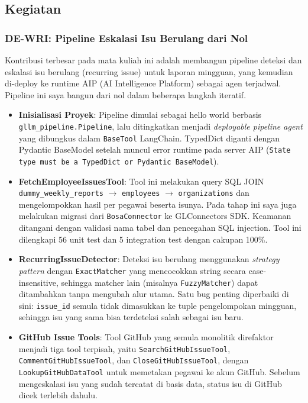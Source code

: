\subsection{Kegiatan}

\subsubsection{DE-WRI: Pipeline Eskalasi Isu Berulang dari Nol}

Kontribusi terbesar pada mata kuliah ini adalah membangun pipeline deteksi dan eskalasi isu berulang (recurring issue) untuk laporan mingguan, yang kemudian di-deploy ke runtime AIP (AI Intelligence Platform) sebagai agen terjadwal. Pipeline ini saya bangun dari nol dalam beberapa langkah iteratif.

\begin{itemize}
    \item \textbf{Inisialisasi Proyek}: Pipeline dimulai sebagai hello world berbasis \texttt{gllm\_pipeline.Pipeline}, lalu ditingkatkan menjadi \textit{deployable pipeline agent} yang dibungkus dalam \texttt{BaseTool} LangChain. TypedDict diganti dengan Pydantic BaseModel setelah muncul error runtime pada server AIP (\texttt{State type must be a TypedDict or Pydantic BaseModel}).
    \item \textbf{FetchEmployeeIssuesTool}: Tool ini melakukan query SQL JOIN \texttt{dummy\_weekly\_reports} $\rightarrow$ \texttt{employees} $\rightarrow$ \texttt{organizations} dan mengelompokkan hasil per pegawai beserta isunya. Pada tahap ini saya juga melakukan migrasi dari \texttt{BosaConnector} ke GLConnectors SDK. Keamanan ditangani dengan validasi nama tabel dan pencegahan SQL injection. Tool ini dilengkapi 56 unit test dan 5 integration test dengan cakupan 100\%.
    \item \textbf{RecurringIssueDetector}: Deteksi isu berulang menggunakan \textit{strategy pattern} dengan \texttt{ExactMatcher} yang mencocokkan string secara case-insensitive, sehingga matcher lain (misalnya \texttt{FuzzyMatcher}) dapat ditambahkan tanpa mengubah alur utama. Satu bug penting diperbaiki di sini: \texttt{issue\_id} semula tidak dimasukkan ke tuple pengelompokan mingguan, sehingga isu yang sama bisa terdeteksi salah sebagai isu baru.
    \item \textbf{GitHub Issue Tools}: Tool GitHub yang semula monolitik direfaktor menjadi tiga tool terpisah, yaitu \texttt{SearchGitHubIssueTool}, \texttt{CommentGitHubIssueTool}, dan \texttt{CloseGitHubIssueTool}, dengan \texttt{LookupGitHubDataTool} untuk memetakan pegawai ke akun GitHub. Sebelum mengeskalasi isu yang sudah tercatat di basis data, status isu di GitHub dicek terlebih dahulu.

\end{itemize}
